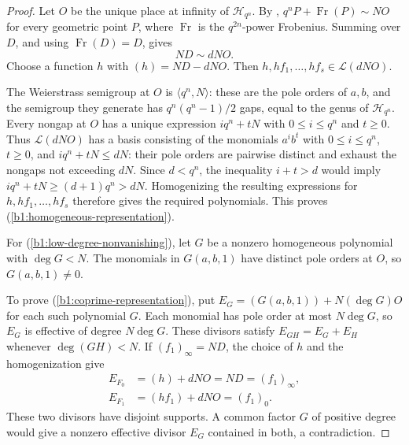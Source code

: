 \documentclass[10pt,a4paper]{amsart}
\numberwithin{equation}{section}
\begin{document}
\begin{proof}
Let \(O\) be the unique place at infinity of \(\mathcal H_{q^n}\).
By \cite[Corollary~1.2]{FGT1997},
\(q^nP+\operatorname{Fr}(P)\sim NO\) for every geometric point
\(P\), where \(\operatorname{Fr}\) is the \(q^{2n}\)-power
Frobenius. Summing over \(D\), and using
\(\operatorname{Fr}(D)=D\), gives
\begin{equation}
\label{b1:divisor-equivalence}
 ND\sim dNO.
\end{equation}
Choose a function \(h\) with \((h)=ND-dNO\). Then
\(h,hf_1,\ldots,hf_s\in\mathcal L(dNO)\).

The Weierstrass semigroup at \(O\) is \(\langle q^n,N\rangle\):
these are the pole orders of \(a,b\), and the semigroup they generate
has \(q^n(q^n-1)/2\) gaps, equal to the genus of \(\mathcal H_{q^n}\).
Every nongap at \(O\) has a unique expression \(iq^n+tN\) with
\(0\le i\le q^n\) and \(t\ge0\). Thus \(\mathcal L(dNO)\) has a basis consisting of the
monomials \(a^i b^t\) with \(0\le i\le q^n\), \(t\ge0\), and
\(iq^n+tN\le dN\): their pole orders are pairwise distinct and
exhaust the nongaps not exceeding \(dN\).
Since \(d<q^n\), the inequality \(i+t>d\) would imply
\(iq^n+tN\ge(d+1)q^n>dN\). Homogenizing the resulting expressions
for \(h,hf_1,\ldots,hf_s\) therefore gives the required polynomials.
This proves \textup{(\ref{b1:homogeneous-representation})}.

For \textup{(\ref{b1:low-degree-nonvanishing})}, let \(G\) be a nonzero homogeneous
polynomial with \(\deg G<N\). The monomials in \(G(a,b,1)\) have
distinct pole orders at \(O\), so \(G(a,b,1)\ne0\).

To prove \textup{(\ref{b1:coprime-representation})}, put
\(E_G=(G(a,b,1))+N(\deg G)O\) for each such polynomial \(G\).
Each monomial has pole order at most \(N\deg G\), so \(E_G\) is
effective of degree \(N\deg G\).
These divisors satisfy \(E_{GH}=E_G+E_H\)
whenever \(\deg(GH)<N\).
If \((f_1)_\infty=ND\), the choice of \(h\) and the homogenization give
\[
 \begin{aligned}
 E_{F_0}&=(h)+dNO=ND=(f_1)_\infty,\\
 E_{F_1}&=(hf_1)+dNO=(f_1)_0.
 \end{aligned}
\]
These two divisors have disjoint supports. A common factor
\(G\) of positive degree would give a nonzero effective divisor
\(E_G\) contained in both, a contradiction.
\end{proof}

\end{document}
